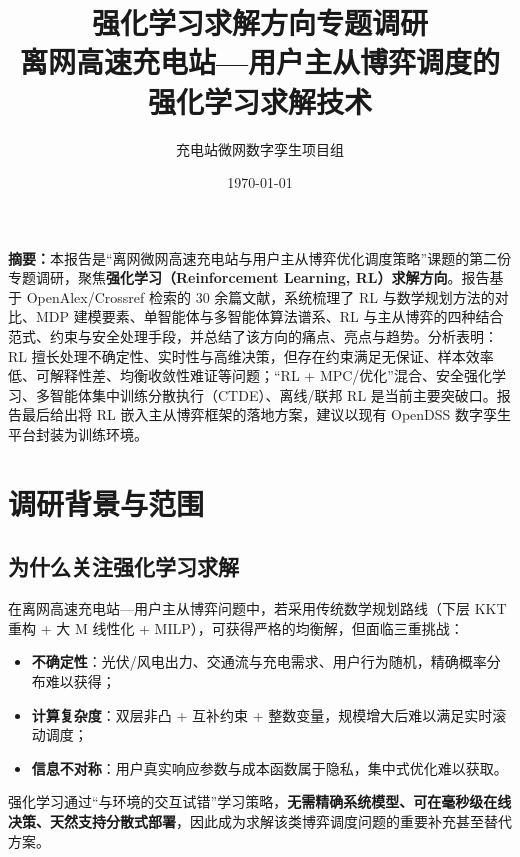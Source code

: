 \documentclass[UTF8,a4paper,11pt]{ctexart}
\title{\vspace{-1.5cm}\textbf{\color{mainblue}强化学习求解方向专题调研}\\[6pt]
\large 离网高速充电站—用户主从博弈调度的\\强化学习求解技术}
\author{充电站微网数字孪生项目组}
\date{\today}
\begin{document}
\maketitle
\thispagestyle{fancy}

\begin{center}
\begin{minipage}{0.92\textwidth}
\small
\textbf{摘要：}本报告是“离网微网高速充电站与用户主从博弈优化调度策略”课题的第二份专题调研，聚焦\textbf{强化学习（Reinforcement Learning, RL）求解方向}。报告基于 OpenAlex/Crossref 检索的 30 余篇文献，系统梳理了 RL 与数学规划方法的对比、MDP 建模要素、单智能体与多智能体算法谱系、RL 与主从博弈的四种结合范式、约束与安全处理手段，并总结了该方向的痛点、亮点与趋势。分析表明：RL 擅长处理不确定性、实时性与高维决策，但存在约束满足无保证、样本效率低、可解释性差、均衡收敛性难证等问题；“RL + MPC/优化”混合、安全强化学习、多智能体集中训练分散执行（CTDE）、离线/联邦 RL 是当前主要突破口。报告最后给出将 RL 嵌入主从博弈框架的落地方案，建议以现有 OpenDSS 数字孪生平台封装为训练环境。
\end{minipage}
\end{center}

\vspace{0.4cm}

\section{调研背景与范围}

\subsection{为什么关注强化学习求解}
在离网高速充电站—用户主从博弈问题中，若采用传统数学规划路线（下层 KKT 重构 + 大 M 线性化 + MILP），可获得严格的均衡解，但面临三重挑战：
\begin{itemize}
  \item \textbf{不确定性}：光伏/风电出力、交通流与充电需求、用户行为随机，精确概率分布难以获得；
  \item \textbf{计算复杂度}：双层非凸 + 互补约束 + 整数变量，规模增大后难以满足实时滚动调度；
  \item \textbf{信息不对称}：用户真实响应参数与成本函数属于隐私，集中式优化难以获取。
\end{itemize}
强化学习通过“与环境的交互试错”学习策略，\textbf{无需精确系统模型、可在毫秒级在线决策、天然支持分散式部署}，因此成为求解该类博弈调度问题的重要补充甚至替代方案。
\end{document}
